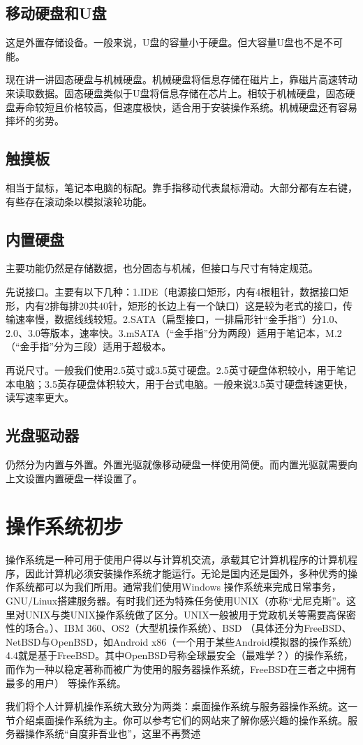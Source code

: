 \subsection{移动硬盘和U盘}
这是外置存储设备。一般来说，U盘的容量小于硬盘。但大容量U盘也不是不可能。\par
现在讲一讲固态硬盘与机械硬盘。机械硬盘将信息存储在磁片上，靠磁片高速转动来读取数据。固态硬盘类似于U盘将信息存储在芯片上。相较于机械硬盘，固态硬盘寿命较短且价格较高，但速度极快，适合用于安装操作系统。机械硬盘还有容易摔坏的劣势。
\subsection{触摸板}
相当于鼠标，笔记本电脑的标配。靠手指移动代表鼠标滑动。大部分都有左右键，有些存在滚动条以模拟滚轮功能。
\subsection{内置硬盘}
主要功能仍然是存储数据，也分固态与机械，但接口与尺寸有特定规范。\par
先说接口。主要有以下几种：1.IDE（电源接口矩形，内有4根粗针，数据接口矩形，内有2排每排20共40针，矩形的长边上有一个缺口）这是较为老式的接口，传输速率慢，数据线线较短。2.SATA（扁型接口，一排扁形针“金手指”）分1.0、2.0、3.0等版本，速率快。3.mSATA（“金手指”分为两段）适用于笔记本，M.2（“金手指”分为三段）适用于超极本。\par
再说尺寸。一般我们使用2.5英寸或3.5英寸硬盘。2.5英寸硬盘体积较小，用于笔记本电脑；3.5英存硬盘体积较大，用于台式电脑。一般来说3.5英寸硬盘转速更快，读写速率更大。
\subsection{光盘驱动器}
仍然分为内置与外置。外置光驱就像移动硬盘一样使用简便。而内置光驱就需要向上文设置内置硬盘一样设置了。
\section{操作系统初步}
操作系统是一种可用于使用户得以与计算机交流，承载其它计算机程序的计算机程序，因此计算机必须安装操作系统才能运行。无论是国内还是国外，多种优秀的操作系统都可以为我们所用。通常我们使用Windows 操作系统来完成日常事务，GNU/Linux搭建服务器。有时我们还为特殊任务使用UNIX（亦称“尤尼克斯”。这里对UNIX与类UNIX操作系统做了区分。UNIX一般被用于党政机关等需要高保密性的场合。）、IBM 360、OS2（大型机操作系统）、BSD （具体还分为FreeBSD、NetBSD与OpenBSD，如Android x86（一个用于某些Android模拟器的操作系统）4.4就是基于FreeBSD。其中OpenBSD号称全球最安全（最难学？）的操作系统，而作为一种以稳定著称而被广为使用的服务器操作系统，FreeBSD在三者之中拥有最多的用户） 等操作系统。\par
我们将个人计算机操作系统大致分为两类：桌面操作系统与服务器操作系统。这一节介绍桌面操作系统为主。你可以参考它们的网站来了解你感兴趣的操作系统。服务器操作系统“自度非吾业也”，这里不再赘述
